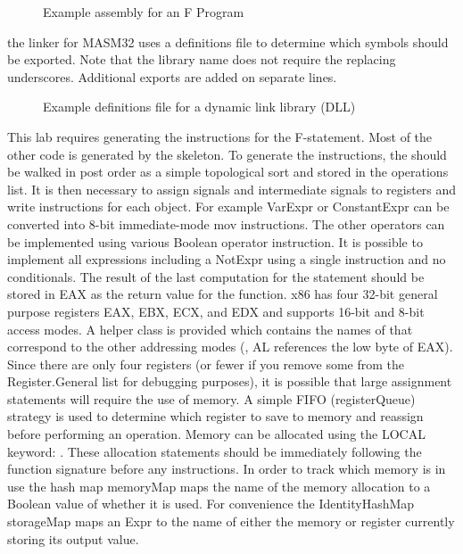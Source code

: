 \begin{figure}
\label{fig:SimulatorExample.asm}
\caption{Example assembly for an F Program}

\end{figure}

\clearpage

 the linker for MASM32 uses a definitions file to determine which symbols should be exported. Note that the library name does not require the replacing underscores. Additional exports are added on separate lines.

\begin{figure}
\label{fig:SimulatorExample.def}
\caption{Example definitions file for a dynamic link library (DLL)}

\end{figure}

%
This lab requires generating the instructions for the F-statement. Most of the other code is generated by the skeleton. To generate the instructions, the \AST should be walked in post order as a simple topological sort and stored in the operations list. It is then necessary to assign signals and intermediate signals to registers and write instructions for each \AST object. For example VarExpr or ConstantExpr can be converted into 8-bit immediate-mode mov instructions. The other operators can be implemented using various Boolean operator instruction. It is possible to implement all expressions including a NotExpr using a single instruction and no conditionals. The result of the last computation for the statement should be stored in EAX as the return value for the function. x86 has four 32-bit general purpose registers EAX, EBX, ECX, and EDX and supports 16-bit and 8-bit access modes. A helper class is provided which contains the names of that correspond to the other addressing modes (\ie, AL references the low byte of EAX). 
%
Since there are only four registers (or fewer if you remove some from the Register.General list for debugging purposes), it is possible that large assignment statements will require the use of memory. A simple FIFO (registerQueue) strategy is used to determine which register to save to memory and reassign before performing an operation. Memory can be allocated using the LOCAL keyword: . These allocation statements should be immediately following the function signature before any instructions. In order to track which memory is in use the hash map memoryMap maps the name of the memory allocation to a Boolean value of whether it is used. For convenience the IdentityHashMap storageMap maps an Expr to the name of either the memory or register currently storing its output value.


